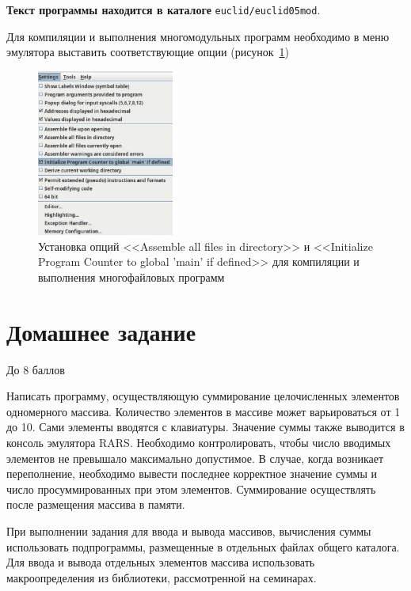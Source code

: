 \textbf{Текст программы находится в каталоге} \verb|euclid/euclid05mod|.

Для компиляции и выполнения многомодульных программ необходимо в меню эмулятора выставить соответствующие опции (рисунок~\ref{mod-params})
\begin{figure}[htbp]
    \centering
    \includegraphics[width=0.4\textwidth]{img/mod-params.png}
    \caption{Установка опций <<Assemble all files in directory>> и <<Initialize Program Counter to global 'main' if defined>> для компиляции и выполнения многофайловых программ}
    \label{mod-params}
\end{figure}



\section{Домашнее задание}

До 8 баллов

Написать программу, осуществляющую суммирование целочисленных элементов одномерного массива. Количество элементов в массиве может варьироваться от 1 до 10. Сами элементы вводятся с клавиатуры. Значение суммы также выводится в консоль эмулятора RARS. Необходимо контролировать, чтобы число вводимых элементов не превышало максимально допустимое. В случае, когда возникает переполнение, необходимо вывести последнее корректное значение суммы и число просуммированных при этом элементов. Суммирование осуществлять после размещения массива в памяти.

При выполнении задания для ввода и вывода массивов, вычисления суммы использовать подпрограммы, размещенные в отдельных файлах общего каталога. Для ввода и вывода отдельных элементов массива использовать макроопределения из библиотеки, рассмотренной на семинарах.

